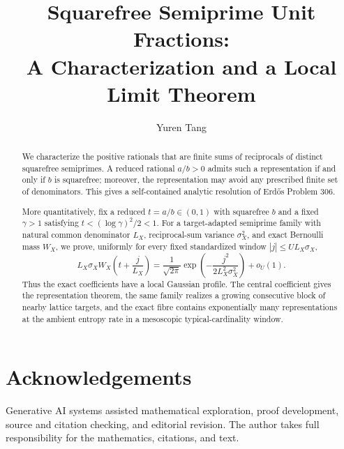 \documentclass[11pt,a4paper,reqno]{amsart}
\title[Squarefree Semiprime Unit Fractions]{Squarefree Semiprime Unit Fractions:\\
A Characterization and a Local Limit Theorem}
\author{Yuren Tang}
\date{}
\theoremstyle{remark}
\numberwithin{equation}{section}
\begin{document}
\begin{abstract}
We characterize the positive rationals that are finite sums of reciprocals of distinct squarefree semiprimes. A reduced rational $a/b>0$ admits such a representation if and only if $b$ is squarefree; moreover, the representation may avoid any prescribed finite set of denominators. This gives a self-contained analytic resolution of Erd\H{o}s Problem 306.

More quantitatively, fix a reduced $t=a/b\in(0,1)$ with squarefree $b$ and a fixed $\gamma>1$ satisfying $t<(\log\gamma)^2/2<1$. For a target-adapted semiprime family with natural common denominator $L_X$, reciprocal-sum variance $\sigma_X^2$, and exact Bernoulli mass $W_X$, we prove, uniformly for every fixed standardized window $|j|\le U L_X\sigma_X$,
\[
L_X\sigma_X W_X\!\left(t+\frac{j}{L_X}\right)
=
\frac{1}{\sqrt{2\pi}}
\exp\!\left(-\frac{j^2}{2L_X^2\sigma_X^2}\right)+o_U(1).
\]
Thus the exact coefficients have a local Gaussian profile. The central coefficient gives the representation theorem, the same family realizes a growing consecutive block of nearby lattice targets, and the exact fibre contains exponentially many representations at the ambient entropy rate in a mesoscopic typical-cardinality window.
\end{abstract}

\maketitle












\section*{Acknowledgements}
Generative AI systems assisted mathematical exploration, proof development, source and citation checking, and editorial revision. The author takes full responsibility for the mathematics, citations, and text.

\printbibliography
\end{document}
